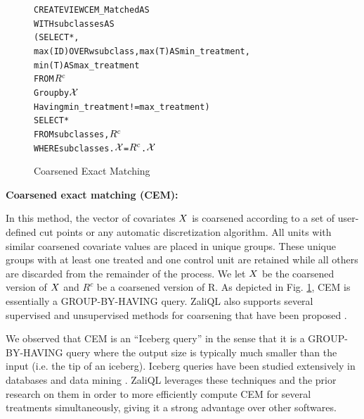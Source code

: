 \begin{figure}
\begin{alltt} \scriptsize
CREATE VIEW CEM_Matched AS
WITH subclasses AS
  (SELECT *,
          max(ID) OVER w subclass, max(T) AS min_treatment,
          min(T)AS max_treatment
   FROM \(\crele\)
   Group by \(\ccv\)
   Having min_treatment!=max_treatment)
SELECT *
FROM subclasses,\(\crele\)
WHERE subclasses.\(\ccv\)=\(\crele\).\(\ccv\)

\end{alltt}
\vspace{-.45cm}
  \caption{Coarsened Exact Matching}\label{fig:cem}
\end{figure}



{\bf Coarsened exact matching (CEM):} 
In this method, the vector of covariates ${{X}}$ is coarsened according to a set of user-defined cut points or any automatic discretization algorithm. All units with similar coarsened covariate values are placed in unique groups. These unique groups with at least one treated and one control unit are retained while all others are discarded from the remainder of the process. We let ${{X}}$ be the coarsened version of ${{X}}$ and $R^c$ be a coarsened version of R. As depicted in Fig. \ref{fig:cem}, CEM is essentially a GROUP-BY-HAVING query. ZaliQL also supports several supervised and unsupervised methods for coarsening that have been proposed \cite{dougherty1995supervised}.

We observed that CEM is an ``Iceberg query'' in the sense that it is a GROUP-BY-HAVING query where the output size is typically much smaller than the input (i.e. the tip of an iceberg). Iceberg queries have been studied extensively in databases and data mining \cite{fang1999computing,findlater2003iceberg}. ZaliQL leverages these techniques and the prior research on them in order to more efficiently compute CEM for several treatments simultaneously, giving it a strong advantage over other softwares.


